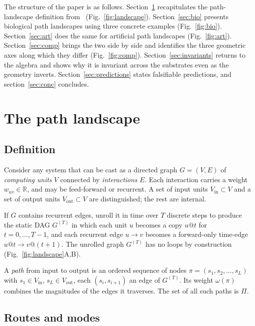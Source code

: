 \documentclass[11pt,a4paper]{article}
\begin{document}
The structure of the paper is as follows. Section~\ref{sec:landscape}
recapitulates the path-landscape definition from~\cite{companion}
(Fig.~\ref{fig:landscape}). Section~\ref{sec:bio} presents biological
path landscapes using three concrete examples
(Fig.~\ref{fig:bio}). Section~\ref{sec:art} does the same for
artificial path landscapes (Fig.~\ref{fig:art}). Section~\ref{sec:comp}
brings the two side by side and identifies the three geometric
axes along which they differ (Fig.~\ref{fig:comp}).
Section~\ref{sec:invariants} returns to the algebra and shows why it
is invariant across the substrates even as the geometry inverts.
Section~\ref{sec:predictions} states falsifiable predictions, and
section~\ref{sec:conc} concludes.

\section{The path landscape}\label{sec:landscape}

\subsection{Definition}

Consider any system that can be cast as a directed graph $G=(V,E)$ of
\emph{computing units} $V$ connected by \emph{interactions} $E$. Each
interaction carries a weight $w_{uv}\in\mathbb{R}$, and may be
feed-forward or recurrent. A set of input units
$V_{\text{in}}\subset V$ and a set of output units
$V_{\text{out}}\subset V$ are distinguished; the rest are internal.

If $G$ contains recurrent edges, unroll it in time over $T$ discrete
steps to produce the static DAG $G^{(T)}$ in which each unit $u$
becomes a copy $u@t$ for $t=0,\dots,T{-}1$, and each recurrent edge
$u\!\to\!v$ becomes a forward-only time-edge $u@t \to v@(t{+}1)$. The
unrolled graph $G^{(T)}$ has no loops by construction
(Fig.~\ref{fig:landscape}A,B).

A \emph{path} from input to output is an ordered sequence of nodes
$\pi = (s_1, s_2, \dots, s_L)$ with $s_1\in V_{\text{in}}$,
$s_L\in V_{\text{out}}$, each $(s_i,s_{i+1})$ an edge of $G^{(T)}$.
Its weight $\omega(\pi)$ combines the magnitudes of the edges it
traverses. The set of all such paths is $\Pi$.

\subsection{Routes and modes}
\end{document}
